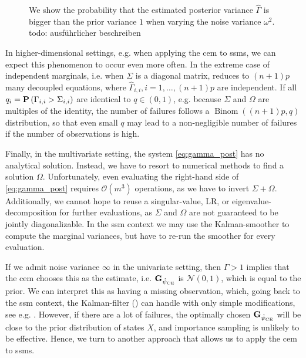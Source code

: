 \begin{figure}
    \resizebox{\textwidth}{!}{%
    }
    \caption{
        We show the probability that the estimated posterior variance $\hat \Gamma$ is bigger than the prior variance $1$ when varying the noise variance $\omega^{2}$. {\color{red} todo: ausführlicher beschreiben} %
    }
    \label{fig:ce_prob_failure}
\end{figure}

In higher-dimensional settings, e.g. when applying the \gls{cem} to \glspl{ssm}, we can expect this phenomenon to occur even more often. In the extreme case of independent marginals, i.e. when $\Sigma$ is a diagonal matrix,  reduces to $(n + 1)p$ many decoupled equations, where $\hat \Gamma_{i,i}, i =1, \dots, (n + 1)p$ are independent. If all $q_{i} = \P \left(\Gamma_{i,i} > \Sigma_{i,i}\right)$ are identical to $q \in (0, 1)$, e.g. because $\Sigma$ and $\Omega$ are multiples of the identity, the number of failures follows a $\operatorname{Binom} \left( (n + 1)p, q \right)$ distribution, so that even small $q$ may lead to a non-negligible number of failures if the number of observations is high. 

Finally, in the multivariate setting, the system \eqref{eq:gamma_post} has no analytical solution. Instead, we have to resort to numerical methods to find a solution $\Omega$. Unfortunately, even evaluating the right-hand side of \eqref{eq:gamma_post} requires $\mathcal O(m^3)$ operations, as we have to invert $\Sigma + \Omega$. Additionally, we cannot hope to reuse a singular-value, LR, or eigenvalue-decomposition for further evaluations, as $\Sigma$ and $\Omega$ are not guaranteed to be jointly diagonalizable.
In the \gls{ssm} context we may use the Kalman-smoother to compute the marginal variances, but have to re-run the smoother for every evaluation. 

If we admit noise variance $\infty$ in the univariate setting, then $\Gamma > 1$ implies that the \gls{cem} chooses this as the estimate, i.e. $\G_{\hpce}$ is $\mathcal N(0, 1)$, which is equal to the prior. We can interpret this as having a missing observation, which, going back to the \gls{ssm} context, the Kalman-filter () can handle with only simple modifications, see e.g. \citep[Section 4.10]{Durbin2012Time}. However, if there are a lot of failures, the optimally chosen $\G_{\hpce}$ will be close to the prior distribution of states $X$, and importance sampling is unlikely to be effective. Hence, we turn to another approach that allows us to apply the \gls{cem} to \glspl{ssm}.

